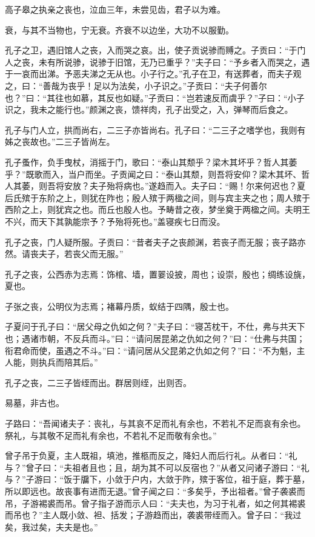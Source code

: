 \documentclass[]{article}
\begin{document}
高子皋之执亲之丧也，泣血三年，未尝见齿，君子以为难。

衰，与其不当物也，宁无衰。齐衰不以边坐，大功不以服勤。

孔子之卫，遇旧馆人之丧，入而哭之哀。出，使子贡说骖而赙之。子贡曰：``于门人之丧，未有所说骖，说骖于旧馆，无乃已重乎？''夫子曰：``予乡者入而哭之，遇于一哀而出涕。予恶夫涕之无从也。小子行之。''孔子在卫，有送葬者，而夫子观之，曰：``善哉为丧乎！足以为法矣，小子识之。''子贡曰：``夫子何善尔也？''曰：``其往也如慕，其反也如疑。''子贡曰：``岂若速反而虞乎？''子曰：``小子识之，我未之能行也。''颜渊之丧，馈祥肉，孔子出受之，入，弹琴而后食之。

孔子与门人立，拱而尚右，二三子亦皆尚右。孔子曰：``二三子之嗜学也，我则有姊之丧故也。''二三子皆尚左。

孔子蚤作，负手曳杖，消摇于门，歌曰：``泰山其颓乎？梁木其坏乎？哲人其萎乎？''既歌而入，当户而坐。子贡闻之曰：``泰山其颓，则吾将安仰？梁木其坏、哲人其萎，则吾将安放？夫子殆将病也。''遂趋而入。夫子曰：``赐！尔来何迟也？夏后氏殡于东阶之上，则犹在阼也；殷人殡于两楹之间，则与宾主夹之也；周人殡于西阶之上，则犹宾之也。而丘也殷人也。予畴昔之夜，梦坐奠于两楹之间。夫明王不兴，而天下其孰能宗予？予殆将死也。''盖寝疾七日而没。

孔子之丧，门人疑所服。子贡曰：``昔者夫子之丧颜渊，若丧子而无服；丧子路亦然。请丧夫子，若丧父而无服。''

孔子之丧，公西赤为志焉：饰棺、墙，置翣设披，周也；设崇，殷也；绸练设旐，夏也。

子张之丧，公明仪为志焉；褚幕丹质，蚁结于四隅，殷士也。

子夏问于孔子曰：``居父母之仇如之何？''夫子曰：``寝苫枕干，不仕，弗与共天下也；遇诸市朝，不反兵而斗。''曰：``请问居昆弟之仇如之何？''曰：``仕弗与共国；衔君命而使，虽遇之不斗。''曰：``请问居从父昆弟之仇如之何？''曰：``不为魁，主人能，则执兵而陪其后。''

孔子之丧，二三子皆绖而出。群居则绖，出则否。

易墓，非古也。

子路曰：``吾闻诸夫子：丧礼，与其哀不足而礼有余也，不若礼不足而哀有余也。祭礼，与其敬不足而礼有余也，不若礼不足而敬有余也。''

曾子吊于负夏，主人既祖，填池，推柩而反之，降妇人而后行礼。从者曰：``礼与？''曾子曰：``夫祖者且也；且，胡为其不可以反宿也？''从者又问诸子游曰：``礼与？''子游曰：``饭于牖下，小敛于户内，大敛于阼，殡于客位，祖于庭，葬于墓，所以即远也。故丧事有进而无退。''曾子闻之曰：``多矣乎，予出祖者。''曾子袭裘而吊，子游裼裘而吊。曾子指子游而示人曰：``夫夫也，为习于礼者，如之何其裼裘而吊也？''主人既小敛、袒、括发；子游趋而出，袭裘带绖而入。曾子曰：``我过矣，我过矣，夫夫是也。''
\end{document}
